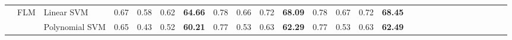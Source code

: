 \documentclass[sn-mathphys]{sn-jnl}%
\theoremstyle{thmstyleone}%
\theoremstyle{thmstyletwo}%
\theoremstyle{thmstylethree}%
\begin{document}
\begin{table*}[hbt!]
{\begin{tabular}{lllcccccccccccccccccccccccc}
\multicolumn{1}{|l|}{}                                  & \multicolumn{1}{l|}{\multirow{6}{*}{FLM}}                                                                    & \multicolumn{1}{l|}{Linear SVM}                           & \multicolumn{1}{c|}{0.67}               & \multicolumn{1}{c|}{0.58}            & \multicolumn{1}{c|}{0.62}              & \multicolumn{1}{c|}{\textbf{64.66}}                                                   & \multicolumn{1}{c|}{0.78}               & \multicolumn{1}{c|}{0.66}            & \multicolumn{1}{c|}{0.72}              & \multicolumn{1}{c|}{\textbf{68.09}}                                                   & \multicolumn{1}{c|}{0.78}               & \multicolumn{1}{c|}{0.67}            & \multicolumn{1}{c|}{0.72}              & \multicolumn{1}{c|}{\textbf{68.45}}                                                   &                      &                      &                      &                      &                      &                      &                      &                      &                      &                      &                      &                      \\ \cline{3-15}
\multicolumn{1}{|l|}{}                                  & \multicolumn{1}{l|}{}                                                                                        & \multicolumn{1}{l|}{Polynomial SVM}                       & \multicolumn{1}{c|}{0.65}               & \multicolumn{1}{c|}{0.43}            & \multicolumn{1}{c|}{0.52}              & \multicolumn{1}{c|}{\textbf{60.21}}                                                   & \multicolumn{1}{c|}{0.77}               & \multicolumn{1}{c|}{0.53}            & \multicolumn{1}{c|}{0.63}              & \multicolumn{1}{c|}{\textbf{62.29}}                                                   & \multicolumn{1}{c|}{0.77}               & \multicolumn{1}{c|}{0.53}            & \multicolumn{1}{c|}{0.63}              & \multicolumn{1}{c|}{\textbf{62.49}}                                                   &                      &                      &                      &                      &                      &                      &                      &                      &                      &                      &                      &                      \\ \cline{3-15}

\end{tabular}}
\end{table*}
\end{document}
